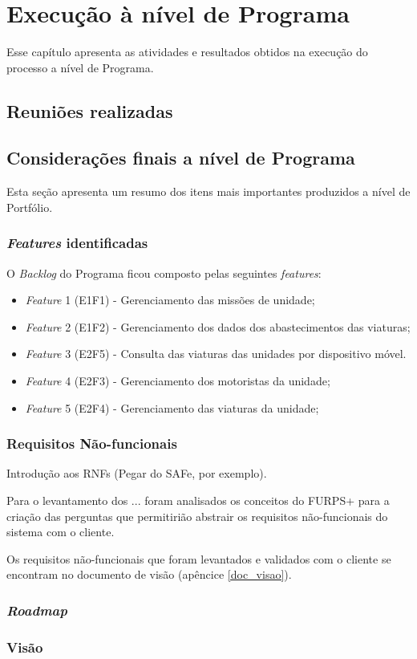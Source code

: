 \chapter{Execução à nível de Programa}

  Esse capítulo apresenta as atividades e resultados obtidos na execução do processo a nível de Programa.
  
  \section{Reuniões realizadas}
  
  \section{Considerações finais a nível de Programa}
    
    Esta seção apresenta um resumo dos itens mais importantes produzidos a nível de Portfólio.
    
    \subsection{\textit{Features} identificadas}
      
      O \textit{Backlog} do Programa ficou composto pelas seguintes \textit{features}:
      
      \begin{itemize}
       \item \textit{Feature} 1 (E1F1) - Gerenciamento das missões de unidade;
       \item \textit{Feature} 2 (E1F2) - Gerenciamento dos dados dos abastecimentos das viaturas;
       \item \textit{Feature} 3 (E2F5) - Consulta das viaturas das unidades por dispositivo móvel. 
       \item \textit{Feature} 4 (E2F3) - Gerenciamento dos motoristas da unidade;
       \item \textit{Feature} 5 (E2F4) - Gerenciamento das viaturas da unidade;
      \end{itemize}
      
      
    \subsection{Requisitos Não-funcionais}
    
          Introdução aos RNFs (Pegar do SAFe, por exemplo).
      
	  Para o levantamento dos ... foram analisados os conceitos do FURPS+ para a criação das perguntas que permitirião abstrair 
	  os requisitos não-funcionais do sistema com o cliente.
	  
	  Os requisitos não-funcionais que foram levantados e validados com o cliente se encontram no
	  documento de visão (apêncice \ref{doc_visao}).	
      
    \subsection{\textit{Roadmap}}
    
      
    
    \subsection{Visão}